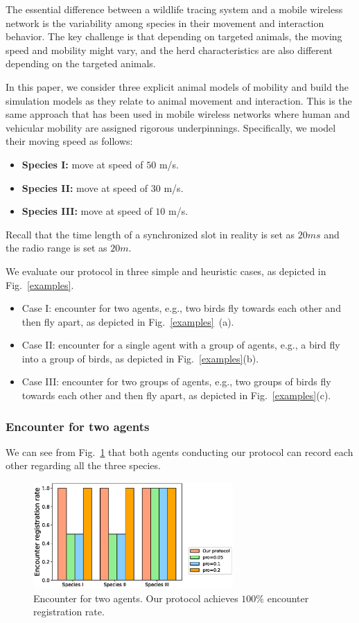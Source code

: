 The essential difference between a wildlife tracing system
and a mobile wireless network is the variability among species in their movement and 
interaction behavior. The key challenge is that depending on targeted animals, 
the moving speed and mobility might vary, and 
the herd characteristics are also different depending on the targeted animals. 

In this paper, we consider three explicit animal models of mobility
and build the simulation models as they relate to animal movement and interaction. 
This is the same approach that has been used in mobile wireless networks where 
human and vehicular mobility are assigned rigorous underpinnings.
Specifically, we model their moving speed as follows:
\begin{itemize}
    \item \textbf{Species I:} move at speed of $50$ m/s. 
    \item \textbf{Species II:} move at speed of $30$ m/s. 
    \item \textbf{Species III:} move at speed of $10$ m/s. 
\end{itemize}
Recall that the time length of a synchronized slot in reality 
is set as $20 ms$ and the radio range is set as $20 m$.

We evaluate our protocol in three simple and heuristic cases, as depicted in Fig.~\ref{examples}.
\begin{itemize}
    \item Case I: encounter for two agents, 
    e.g., two birds fly towards each other and then 
    fly apart, as depicted in Fig.~\ref{examples}~(a). 
    \item Case II: encounter for a single 
    agent with a group of agents, e.g., a bird fly into 
    a group of birds, as depicted in Fig.~\ref{examples}(b).
    \item Case III: encounter for two groups of agents, 
    e.g., two groups of birds fly towards each other and then fly 
    apart, as depicted in Fig.~\ref{examples}(c).
\end{itemize}

\subsubsection{Encounter for two agents}

We can see from Fig.~\ref{fig7} that both
agents conducting our protocol can record each
other regarding all the three species.

\begin{figure}[!h]
    \centering
    \includegraphics[width=3in]{figures/figure7.eps}
    \caption{Encounter for two agents. Our protocol
    achieves $100\%$ encounter registration rate.}
    \label{fig7}
\end{figure}

